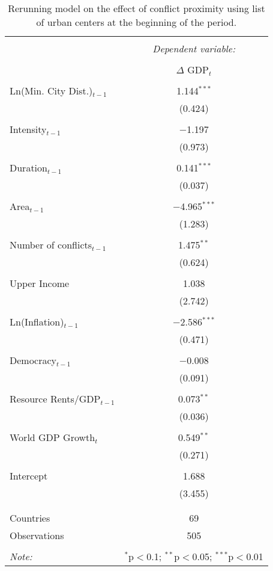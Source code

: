 \begin{table}[!htbp] \centering 
  \caption{Rerunning model on the effect of conflict proximity using list of urban centers at the beginning of the period.} 
  \label{tab:modOrigCity} 
\begin{tabular}{@{\extracolsep{5pt}}lc} 
\\[-1.8ex]\hline 
\hline \\[-1.8ex] 
 & \multicolumn{1}{c}{\textit{Dependent variable:}} \\ 
\cline{2-2} 
\\[-1.8ex] & $\Delta$ GDP$_{t}$ \\ 
\hline \\[-1.8ex] 
 Ln(Min. City Dist.)$_{t-1}$ & 1.144$^{***}$ \\ 
  & (0.424) \\ 
  & \\ 
 Intensity$_{t-1}$ & $-$1.197 \\ 
  & (0.973) \\ 
  & \\ 
 Duration$_{t-1}$ & 0.141$^{***}$ \\ 
  & (0.037) \\ 
  & \\ 
 Area$_{t-1}$ & $-$4.965$^{***}$ \\ 
  & (1.283) \\ 
  & \\ 
 Number of conflicts$_{t-1}$ & 1.475$^{**}$ \\ 
  & (0.624) \\ 
  & \\ 
 Upper Income & 1.038 \\ 
  & (2.742) \\ 
  & \\ 
 Ln(Inflation)$_{t-1}$ & $-$2.586$^{***}$ \\ 
  & (0.471) \\ 
  & \\ 
 Democracy$_{t-1}$ & $-$0.008 \\ 
  & (0.091) \\ 
  & \\ 
 Resource Rents/GDP$_{t-1}$ & 0.073$^{**}$ \\ 
  & (0.036) \\ 
  & \\ 
 World GDP Growth$_{t}$ & 0.549$^{**}$ \\ 
  & (0.271) \\ 
  & \\ 
 Intercept & 1.688 \\ 
  & (3.455) \\ 
  & \\ 
\hline \\[-1.8ex] 
Countries & 69 \\
Observations & 505 \\ 
\hline 
\hline \\[-1.8ex] 
\textit{Note:}  & \multicolumn{1}{r}{$^{*}$p$<$0.1; $^{**}$p$<$0.05; $^{***}$p$<$0.01} \\ 
\end{tabular} 
\end{table} 